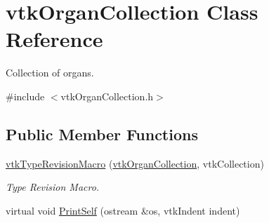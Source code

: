 \hypertarget{classvtkOrganCollection}{
\section{vtkOrganCollection Class Reference}
\label{classvtkOrganCollection}
}


Collection of organs.  




{\ttfamily \#include $<$vtkOrganCollection.h$>$}

\subsection*{Public Member Functions}
\begin{DoxyCompactItemize}
\item 
\hypertarget{classvtkOrganCollection_a54e95f6cf19cfe045483cf5b0d665958}{
\hyperlink{classvtkOrganCollection_a54e95f6cf19cfe045483cf5b0d665958}{vtkTypeRevisionMacro} (\hyperlink{classvtkOrganCollection}{vtkOrganCollection}, vtkCollection)}
\label{classvtkOrganCollection_a54e95f6cf19cfe045483cf5b0d665958}

\begin{DoxyCompactList}\small\item\em Type Revision Macro. \item\end{DoxyCompactList}\item 
\hypertarget{classvtkOrganCollection_aa5c16d7a18c0cf5ee6e867850415a26c}{
virtual void \hyperlink{classvtkOrganCollection_aa5c16d7a18c0cf5ee6e867850415a26c}{PrintSelf} (ostream \&os, vtkIndent indent)}
\label{classvtkOrganCollection_aa5c16d7a18c0cf5ee6e867850415a26c}


\end{DoxyCompactItemize}
